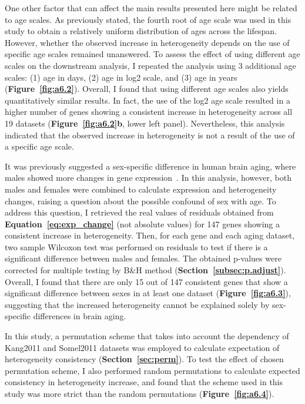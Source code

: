 One other factor that can affect the main results presented here might be related to age scales.
As previously stated, the fourth root of age scale was used in this study to obtain a relatively uniform distribution of ages across the lifespan.
However, whether the observed increase in heterogeneity depends on the use of specific age scales remained unanswered.
To assess the effect of using different age scales on the downstream analysis, I repeated the analysis using 3 additional age scales: 
(1) age in days, (2) age in log2 scale, and (3) age in years (\textbf{Figure~\ref{fig:a6.2}}).
Overall, I found that using different age scales also yields quantitatively similar results.
In fact, the use of the log2 age scale resulted in a higher number of genes showing a consistent increase in heterogeneity across all 19 datasets (\textbf{Figure~\ref{fig:a6.2}b}, lower left panel).
Nevertheless, this analysis indicated that the observed increase in heterogeneity is not a result of the use of a specific age scale.

It was previously suggested a sex-specific difference in human brain aging, where males showed more changes in gene expression~\autocite{Berchtold2008}.
In this analysis, however, both males and females were combined to calculate expression and heterogeneity changes, raising a question about the possible confound of sex with age.
To address this question, I retrieved the real values of residuals obtained from \textbf{Equation~\ref{eq:exp_change}} 
(not absolute values) for 147 genes showing a consistent increase in heterogeneity.
Then, for each gene and each aging dataset, two sample Wilcoxon test was performed on residuals to test if there is a significant difference between males and females.
The obtained p-values were corrected for multiple testing by B{\&}H method (\textbf{Section~\ref{subsec:p.adjust}}).
Overall, I found that there are only 15 out of 147 consistent genes that show a significant difference between sexes in at least one dataset (\textbf{Figure~\ref{fig:a6.3}}),
suggesting that the increased heterogeneity cannot be explained solely by sex-specific differences in brain aging.

In this study, a permutation scheme that takes into account the dependency of Kang2011 and Somel2011 
datasets was employed to calculate expectation of heterogeneity consistency (\textbf{Section~\ref{sec:perm}}).
To test the effect of chosen permutation scheme, I also performed random permutations to calculate expected consistency in heterogeneity increase, 
and found that the scheme used in this study was more strict than the random permutations (\textbf{Figure~\ref{fig:a6.4}}).


